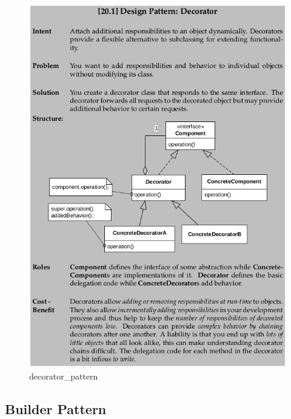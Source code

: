 \documentclass[11pt]{article}
\makeatletter
\def\maxwidth{\ifdim\Gin@nat@width>\linewidth\linewidth
    \else\Gin@nat@width\fi}
\let\Oldincludegraphics\includegraphics
\renewcommand{\includegraphics}[1]{\Oldincludegraphics[width=.8\maxwidth]{#1}}
\makeatother
\begin{document}
\begin{figure}
\centering
\includegraphics{img/decorator_pattern.png}
\caption{decorator\_pattern}
\end{figure}

\hypertarget{builder-pattern}{%
\subsection{Builder Pattern}\label{builder-pattern}}
\end{document}
